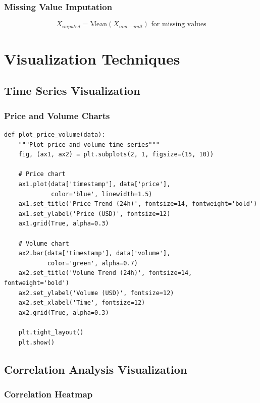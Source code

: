 \documentclass[12pt,a4paper]{article}
\begin{document}
\subsubsection{Missing Value Imputation}

\begin{equation}
X_{imputed} = \text{Mean}(X_{non-null}) \text{ for missing values}
\end{equation}

\section{Visualization Techniques}

\subsection{Time Series Visualization}

\subsubsection{Price and Volume Charts}

\begin{lstlisting}
def plot_price_volume(data):
    """Plot price and volume time series"""
    fig, (ax1, ax2) = plt.subplots(2, 1, figsize=(15, 10))
    
    # Price chart
    ax1.plot(data['timestamp'], data['price'], 
             color='blue', linewidth=1.5)
    ax1.set_title('Price Trend (24h)', fontsize=14, fontweight='bold')
    ax1.set_ylabel('Price (USD)', fontsize=12)
    ax1.grid(True, alpha=0.3)
    
    # Volume chart
    ax2.bar(data['timestamp'], data['volume'], 
            color='green', alpha=0.7)
    ax2.set_title('Volume Trend (24h)', fontsize=14, fontweight='bold')
    ax2.set_ylabel('Volume (USD)', fontsize=12)
    ax2.set_xlabel('Time', fontsize=12)
    ax2.grid(True, alpha=0.3)
    
    plt.tight_layout()
    plt.show()
\end{lstlisting}

\subsection{Correlation Analysis Visualization}

\subsubsection{Correlation Heatmap}
\end{document}
